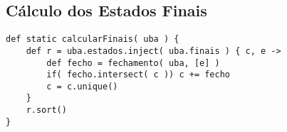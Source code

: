 \subsection{Cálculo dos Estados Finais}

\begin{lstlisting}
def static calcularFinais( uba ) {
    def r = uba.estados.inject( uba.finais ) { c, e ->
        def fecho = fechamento( uba, [e] )
        if( fecho.intersect( c )) c += fecho
        c = c.unique()
    }
    r.sort()
}
\end{lstlisting}

